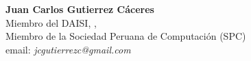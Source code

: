 \begin{center}
\textbf{Juan Carlos Gutierrez Cáceres}\\
Miembro del DAISI, \University, \city\\
Miembro de la Sociedad Peruana de Computación (SPC)\\
email: \textit{jcgutierrezc@gmail.com}
\end{center}
